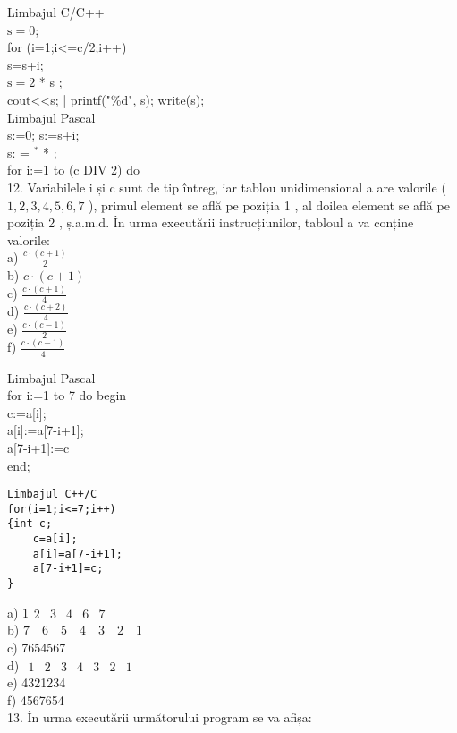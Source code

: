 Limbajul C/C++\\
$\mathrm{s}=0$;\\
for (i=1;i<=c/2;i++)\\
s=s+i;\\
$\mathrm{s}=2$ * s ;\\
cout<<s; | printf("\%d", s); write(s);\\
Limbajul Pascal\\
s:=0; s:=s+i;\\
s: = ${ }^{*}$ * ;\\
for i:=1 to (c DIV 2) do\\
12. Variabilele i și c sunt de tip întreg, iar tablou unidimensional a are valorile ( $1,2,3,4,5,6,7$ ), primul element se află pe poziția 1 , al doilea element se află pe poziția 2 , ș.a.m.d. În urma executării instrucțiunilor, tabloul a va conține valorile:\\
a) $\frac{c \cdot(c+1)}{2}$\\
b) $c \cdot(c+1)$\\
c) $\frac{c \cdot(c+1)}{4}$\\
d) $\frac{c \cdot(c+2)}{4}$\\
e) $\frac{c \cdot(c-1)}{2}$\\
f) $\frac{c \cdot(c-1)}{4}$

Limbajul Pascal\\
for i:=1 to 7 do begin\\[0pt]
c:=a[i];\\[0pt]
a[i]:=a[7-i+1];\\[0pt]
a[7-i+1]:=c\\
end;

\begin{verbatim}
Limbajul C++/C
for(i=1;i<=7;i++)
{int c;
    c=a[i];
    a[i]=a[7-i+1];
    a[7-i+1]=c;
}
\end{verbatim}

a) $1 \begin{array}{llllll}2 & 3 & 4 & 6 & 7\end{array}$\\
b) $7 \quad 6 \quad 5 \quad 4 \quad 3 \quad 2 \quad 1$\\
c) 7654567\\
d) $\begin{array}{lllllll}1 & 2 & 3 & 4 & 3 & 2 & 1\end{array}$\\
e) 4321234\\
f) 4567654\\
13. În urma executării următorului program se va afișa:

